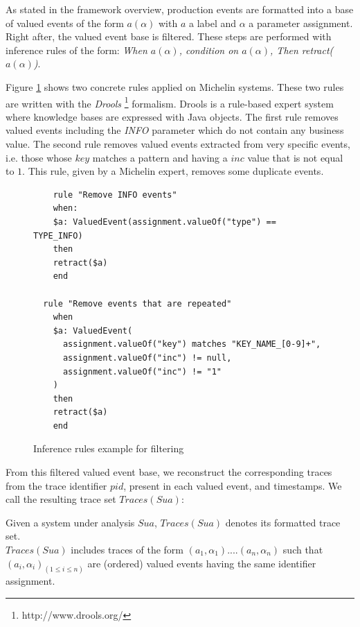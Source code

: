 As stated in the framework overview, production events are
formatted into a base of valued events of the form $a(\alpha)$
with $a$ a label and $\alpha$ a parameter assignment. Right
after, the valued event base is filtered. These steps are
performed with inference rules of the form: \textit{When
$a(\alpha)$, condition on $a(\alpha)$, Then retract($a(\alpha)$)}.

Figure \ref{fig:removalrules} shows two concrete rules applied on
Michelin systems. These two rules are written with the
\textit{Drools} \footnote{http://www.drools.org/} formalism.
Drools is a rule-based expert system where knowledge bases are
expressed with Java objects. The first rule removes valued events
including the \textit{INFO} parameter which do not contain any
business value. The second rule removes valued events extracted
from very specific events, i.e. those whose $key$ matches a
pattern and having a $inc$ value that is not equal to $1$. This
rule, given by a Michelin expert, removes some duplicate events.

\begin{figure}[H]
	\begin{lstlisting}
	rule "Remove INFO events"
	when:
    $a: ValuedEvent(assignment.valueOf("type") == TYPE_INFO)
	then
    retract($a)
	end

  rule "Remove events that are repeated"
	when
    $a: ValuedEvent(
      assignment.valueOf("key") matches "KEY_NAME_[0-9]+",
      assignment.valueOf("inc") != null,
      assignment.valueOf("inc") != "1"
    )
	then
    retract($a)
	end
	\end{lstlisting}

	\caption{Inference rules example for filtering}
	\label{fig:removalrules}
\end{figure}

From this filtered valued event base, we reconstruct the
corresponding traces from the trace identifier $pid$, present in
each valued event, and timestamps. We call the resulting trace
set $Traces(Sua)$:\\

\begin{definition}
    Given a system under analysis $Sua$, $Traces(Sua)$ denotes
    its formatted trace set.\\$Traces(Sua)$ includes traces of the
    form $(a_1,\alpha_1)....(a_n,\alpha_n)$ such that
    $(a_i,\alpha_i)_{(1 \leq i \leq n)}$ are (ordered) valued
    events having the same identifier assignment.

	\label{def:structuredtrace}
\end{definition}

